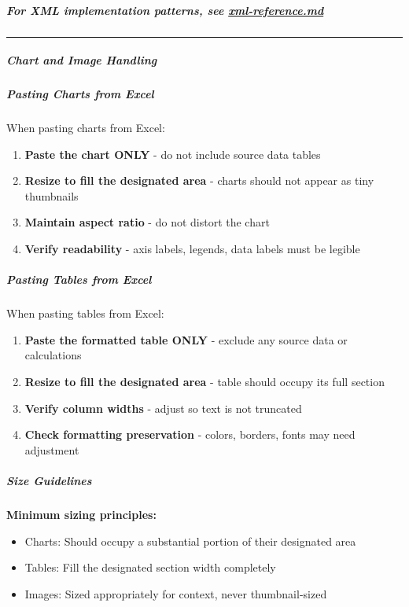 \documentclass[11pt]{article}
\begin{document}
\subparagraph{For XML implementation patterns, see \href{xml-reference.md\#table-implementation}{\emph{xml-reference.md}}}\mbox{}\par

\vspace{0.5em}\hrule\vspace{0.5em}

\subparagraph{Chart and Image Handling}\mbox{}\par

\subparagraph{Pasting Charts from Excel}\mbox{}\par

When pasting charts from Excel:


\begin{enumerate}[leftmargin=*,itemsep=2pt,topsep=2pt]
\item {} \textbf{Paste the chart ONLY} - do not include source data tables
\item {} \textbf{Resize to fill the designated area} - charts should not appear as tiny thumbnails
\item {} \textbf{Maintain aspect ratio} - do not distort the chart
\item {} \textbf{Verify readability} - axis labels, legends, data labels must be legible
\end{enumerate}

\subparagraph{Pasting Tables from Excel}\mbox{}\par

When pasting tables from Excel:


\begin{enumerate}[leftmargin=*,itemsep=2pt,topsep=2pt]
\item {} \textbf{Paste the formatted table ONLY} - exclude any source data or calculations
\item {} \textbf{Resize to fill the designated area} - table should occupy its full section
\item {} \textbf{Verify column widths} - adjust so text is not truncated
\item {} \textbf{Check formatting preservation} - colors, borders, fonts may need adjustment
\end{enumerate}

\subparagraph{Size Guidelines}\mbox{}\par

\textbf{Minimum sizing principles:}

\begin{itemize}[leftmargin=*,itemsep=2pt,topsep=2pt]
\item {} Charts: Should occupy a substantial portion of their designated area
\item {} Tables: Fill the designated section width completely
\item {} Images: Sized appropriately for context, never thumbnail-sized
\end{itemize}
\end{document}
